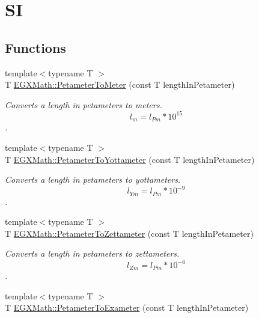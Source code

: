 \hypertarget{group___e_g_x_math-_conversions-_length_conversions-_petameter-_s_i}{}\section{SI}
\label{group___e_g_x_math-_conversions-_length_conversions-_petameter-_s_i}
\subsection*{Functions}
\begin{DoxyCompactItemize}
\item 
{\footnotesize template$<$typename T $>$ }\\T \mbox{\hyperlink{group___e_g_x_math-_conversions-_length_conversions-_petameter-_s_i_ga604a637d8bd107a2eaa162757b2e813b}{E\+G\+X\+Math\+::\+Petameter\+To\+Meter}} (const T length\+In\+Petameter)
\begin{DoxyCompactList}\small\item\em Converts a length in petameters to meters. \[ l_{m}=l_{Pm} * 10^{15} \]. \end{DoxyCompactList}\item 
{\footnotesize template$<$typename T $>$ }\\T \mbox{\hyperlink{group___e_g_x_math-_conversions-_length_conversions-_petameter-_s_i_ga9ffc5119dfdd8427918e9f6cd6e4c2c8}{E\+G\+X\+Math\+::\+Petameter\+To\+Yottameter}} (const T length\+In\+Petameter)
\begin{DoxyCompactList}\small\item\em Converts a length in petameters to yottameters. \[ l_{Ym}=l_{Pm} * 10^{-9} \]. \end{DoxyCompactList}\item 
{\footnotesize template$<$typename T $>$ }\\T \mbox{\hyperlink{group___e_g_x_math-_conversions-_length_conversions-_petameter-_s_i_gabea28636f814fa1d8a3ce9590478e3e4}{E\+G\+X\+Math\+::\+Petameter\+To\+Zettameter}} (const T length\+In\+Petameter)
\begin{DoxyCompactList}\small\item\em Converts a length in petameters to zettameters. \[ l_{Zm}=l_{Pm} * 10^{-6} \]. \end{DoxyCompactList}\item 
{\footnotesize template$<$typename T $>$ }\\T \mbox{\hyperlink{group___e_g_x_math-_conversions-_length_conversions-_petameter-_s_i_gade75826e3cd26e484252c5d5a9d1bf8c}{E\+G\+X\+Math\+::\+Petameter\+To\+Exameter}} (const T length\+In\+Petameter)

\end{DoxyCompactItemize}
